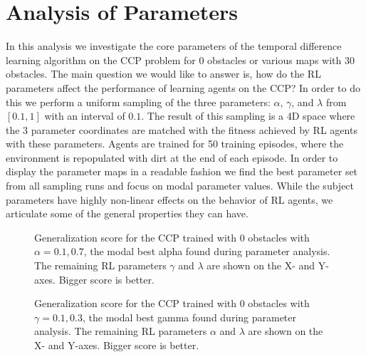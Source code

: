 \documentclass[conference]{IEEEtran}
\begin{document}
\section{Analysis of Parameters}

In this analysis we investigate the core parameters of the temporal difference
learning algorithm on the CCP problem for 0 obstacles or various maps with 30
obstacles. The main question we would like to answer is, how do the RL parameters
affect the performance of learning agents on the CCP? In order to do this we 
perform a uniform sampling of the three parameters: $\alpha$, $\gamma$, and
$\lambda$ from $[0.1, 1]$ with an interval of $0.1$. The result of this sampling
is a 4D space where the 3 parameter coordinates are matched with the fitness
achieved by RL agents with these parameters. Agents are trained for 50 training
episodes, where the environment is repopulated with dirt at the end of each
episode. In order to display the parameter maps in a readable fashion we find
the best parameter set from all sampling runs and focus on modal parameter
values. While the subject parameters have highly non-linear effects on the
behavior of RL agents, we articulate some of the general properties they can
have.

\begin{figure}
\centering
\vspace{-5pt}
\caption{Generalization score for the CCP trained with 0 obstacles with $\alpha = 0.1, 0.7$, the modal best alpha found during parameter analysis.
The remaining RL parameters $\gamma$ and $\lambda$ are shown on the X- and Y-axes. Bigger score is better. }
\label{fig:alpha_analysis_0obs}
\vspace{-5pt}
\end{figure}

\begin{figure}
\centering
\vspace{-5pt}
\caption{Generalization score for the CCP trained with 0 obstacles with $\gamma = 0.1, 0.3$, the modal best gamma found during parameter analysis.
The remaining RL parameters $\alpha$ and $\lambda$ are shown on the X- and Y-axes. Bigger score is better. }
\label{fig:gamma_analysis_0obs}
\vspace{-5pt}
\end{figure}
\end{document}
